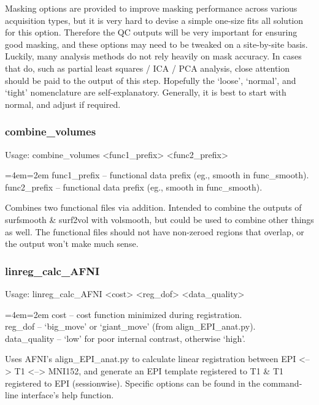 \documentclass[final,titlepage,letterpaper,oneside,12pt]{article}
\renewcommand{\texttt}[2][BrickRed]{\textcolor{#1}{\ttfamily #2}}%
\newenvironment{blockquote}{%
  \par%
  \medskip
  \leftskip=4em\rightskip=2em%
  \noindent\ignorespaces}{%
  \par\medskip}
\begin{document}
Masking options are provided to improve masking performance across various acquisition types, but it is very hard to devise a simple one-size fits all solution for this option. Therefore the QC outputs will be very important for ensuring good masking, and these options may need to be tweaked on a site-by-site basis. Luckily, many analysis methods do not rely heavily on mask accuracy. In cases that do, such as partial least squares / ICA / PCA analysis, close attention should be paid to the output of this step. Hopefully the `loose', `normal', and `tight' nomenclature are self-explanatory. Generally, it is best to start with normal, and adjust if required. 

\subsubsection{combine\_volumes}
Usage: \texttt{combine\_volumes <func1\_prefix> <func2\_prefix>}

\begin{blockquote}
func1\_prefix -- functional data prefix (eg., smooth in func\_smooth).
func2\_prefix -- functional data prefix (eg., smooth in func\_smooth).
\end{blockquote}

\noindent Combines two functional files via addition. Intended to combine the outputs of \texttt{surfsmooth} \& \texttt{surf2vol} with \texttt{volsmooth}, but could be used to combine other things as well. The functional files should not have non-zeroed regions that overlap, or the output won't make much sense.

\subsubsection{linreg\_calc\_AFNI}
Usage: \texttt{linreg\_calc\_AFNI <cost> <reg\_dof> <data\_quality>}

\begin{blockquote}
cost -- cost function minimized during registration. \\
reg\_dof -- `big\_move' or `giant\_move' (from align\_EPI\_anat.py). \\
data\_quality -- `low' for poor internal contrast, otherwise `high'. \
\end{blockquote}

\noindent Uses AFNI's align\_EPI\_anat.py to calculate linear registration between EPI <--> T1 <--> MNI152, and generate an EPI template registered to T1 \& T1 registered to EPI (sessionwise). Specific options can be found in the command-line interface's help function.
\end{document}
